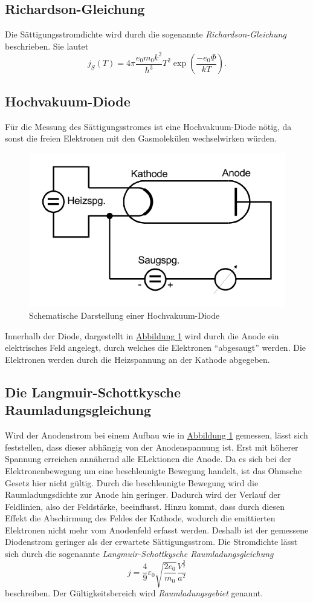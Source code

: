 \subsection{Richardson-Gleichung}
\label{eq:Richardson}
Die Sättigungsstromdichte wird durch die sogenannte \textit{Richardson-Gleichung} \cite{v504} beschrieben. Sie lautet
\begin{equation}
    j_{S}(T)=4 \pi \frac{e_{0} m_{0} k^{2}}{h^{3}} T^{2} \exp \left(\frac{-e_{0} \Phi}{k T}\right) .
\end{equation}
\subsection{Hochvakuum-Diode}
Für die Messung des Sättigungsstromes ist eine Hochvakuum-Diode nötig, da sonst die freien Elektronen mit den Gasmolekülen wechselwirken würden.
\begin{figure} [H]
    \center
    \caption{Schematische Darstellung einer Hochvakuum-Diode}\label{fig:Diode}
    \includegraphics[width=0.5\linewidth]{pictures/Diode.pdf}
\end{figure}
Innerhalb der Diode, dargestellt in \hyperref[fig:Diode]{Abbildung \ref{fig:Diode}} wird durch die Anode ein elektrisches Feld angelegt, durch welches die Elektronen \enquote{abgesaugt} werden.
Die Elektronen werden durch die Heizspannung an der Kathode abgegeben.

\subsection{Die Langmuir-Schottkysche Raumladungsgleichung}
Wird der Anodenstrom bei einem Aufbau wie in \hyperref[fig:Diode]{Abbildung \ref{fig:Diode}} gemessen, lässt sich feststellen,
dass dieser abhängig von der Anodenspannung ist.
Erst mit höherer Spannung erreichen annähernd alle ELektionen die Anode.
Da es sich bei der Elektronenbewegung um eine beschleunigte Bewegung handelt, ist das Ohmsche Gesetz hier nicht gültig.
Durch die beschleunigte Bewegung wird die Raumladungsdichte zur Anode hin geringer.
Dadurch wird der Verlauf der Feldlinien, also der Feldstärke, beeinflusst.
Hinzu kommt, dass durch diesen Effekt die Abschirmung des Feldes der Kathode, wodurch die emittierten
Elektronen nicht mehr vom Anodenfeld erfasst werden.
Deshalb ist der gemessene Diodenstrom geringer als der erwartete Sättigungsstrom.
Die Stromdichte lässt sich durch die sogenannte \textit{Langmuir-Schottkysche Raumladungsgleichung} 
\begin{equation}\label{eq:lsr}
    j=\frac{4}{9} \varepsilon_{0} \sqrt{\frac{2 e_{0} }{ m_{0}}} \frac{V^{\frac{3}{2}}}{a^{2}}
\end{equation}
beschreiben. Der Gültigkeitsbereich wird \textit{Raumladungsgebiet} genannt.

